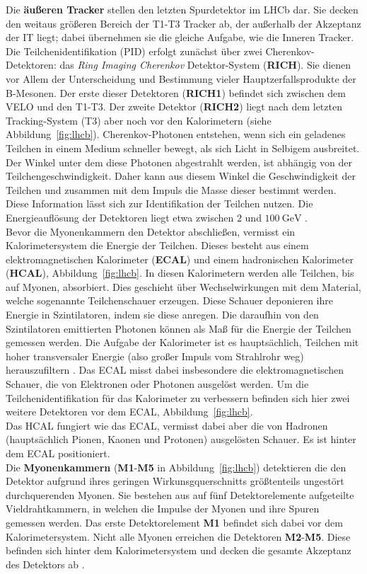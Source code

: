 Die \textbf{äußeren Tracker} stellen den letzten Spurdetektor im LHCb dar. Sie decken den weitaus größeren Bereich der T1-T3 Tracker ab, der außerhalb der Akzeptanz der IT liegt; dabei übernehmen sie die gleiche Aufgabe, wie die Inneren Tracker.\\
%
Die Teilchenidentifikation (PID) erfolgt zunächst über zwei Cherenkov-Detektoren: das \textit{Ring Imaging Cherenkov} Detektor-System (\textbf{RICH}). Sie dienen vor Allem der Unterscheidung und Bestimmung vieler Hauptzerfallsprodukte der B-Mesonen\cite{lhcb}. Der erste dieser Detektoren (\textbf{RICH1}) befindet sich zwischen dem VELO und den T1-T3. Der zweite Detektor (\textbf{RICH2}) liegt nach dem letzten Tracking-System (T3) aber noch vor den Kalorimetern (siehe Abbildung~\ref{fig:lhcb}). Cherenkov-Photonen entstehen, wenn sich ein geladenes Teilchen in einem Medium schneller bewegt, als sich Licht in Selbigem ausbreitet. Der Winkel unter dem diese Photonen abgestrahlt werden, ist abhängig von der Teilchengeschwindigkeit. Daher kann aus diesem Winkel die Geschwindigkeit der Teilchen und zusammen mit dem Impuls die Masse dieser bestimmt werden. Diese Information lässt sich zur Identifikation der Teilchen nutzen. Die Energieauflösung der Detektoren liegt etwa zwischen $2$ und $\SI{100}{\giga\electronvolt}$ \cite{lhcb}.\\
%
Bevor die Myonenkammern den Detektor abschließen, vermisst ein Kalorimetersystem die Energie der Teilchen. Dieses besteht aus einem elektromagnetischen Kalorimeter (\textbf{ECAL}) und einem hadronischen Kalorimeter (\textbf{HCAL}), Abbildung~\ref{fig:lhcb}. In  diesen Kalorimetern werden alle Teilchen, bis auf Myonen, absorbiert. Dies geschieht über Wechselwirkungen mit dem Material, welche sogenannte Teilchenschauer erzeugen. Diese Schauer deponieren ihre Energie in Szintilatoren, indem sie diese anregen. Die daraufhin von den Szintilatoren emittierten Photonen können als Maß für die Energie der Teilchen gemessen werden. Die Aufgabe der Kalorimeter ist es hauptsächlich, Teilchen mit hoher transversaler Energie (also großer Impuls vom Strahlrohr weg) herauszufiltern \cite{lhcb}. Das ECAL misst dabei insbesondere die elektromagnetischen Schauer, die von Elektronen oder Photonen ausgelöst werden. Um die Teilchenidentifikation für das Kalorimeter zu verbessern befinden sich hier zwei weitere Detektoren vor dem ECAL, Abbildung~\ref{fig:lhcb}. \\
Das HCAL fungiert wie das ECAL, vermisst dabei aber die von Hadronen (hauptsächlich Pionen, Kaonen und Protonen) ausgelösten Schauer. Es ist hinter dem ECAL positioniert. \\
%
Die \textbf{Myonenkammern} (\textbf{M1}-\textbf{M5} in Abbildung~\ref{fig:lhcb}) detektieren die den Detektor aufgrund ihres geringen Wirkunsgquerschnitts größtenteils ungestört durchquerenden Myonen. Sie bestehen aus auf fünf Detektorelemente aufgeteilte Vieldrahtkammern, in welchen die Impulse der Myonen und ihre Spuren gemessen werden. Das erste Detektorelement \textbf{M1} befindet sich dabei vor dem Kalorimetersystem. Nicht alle Myonen erreichen die Detektoren \textbf{M2}-\textbf{M5}. Diese befinden sich hinter dem Kalorimetersystem und decken die gesamte Akzeptanz des Detektors ab \cite{lhcb}.
